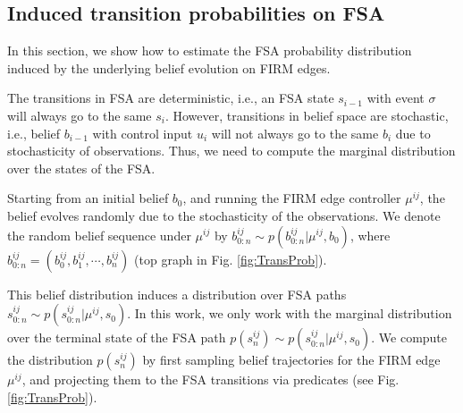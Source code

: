 \documentclass[conference]{IEEEtran}
\begin{document}






\subsection{Induced transition probabilities on FSA}
\label{sec:TransProb}
In this section, we show how to estimate the FSA probability distribution induced by the underlying belief evolution on FIRM edges. 

The transitions in FSA are deterministic, i.e., an FSA state $s_{i-1}$ with event $\sigma$ will always go to the same $s_{i}$. However, transitions in belief space are stochastic, i.e., belief $b_{i-1}$ with control input $u_{i}$ will not always go to the same $b_{i}$ due to stochasticity of observations.
Thus, we need to compute the marginal distribution over the states of the FSA.

Starting from an initial belief $b_{0}$, and running the FIRM edge controller $\mu^{ij}$, the belief evolves randomly due to the stochasticity of the observations. We denote the random belief sequence under $\mu^{ij}$ by $b_{0:n}^{ij}\sim p(b_{0:n}^{ij}|\mu^{ij},b_0)$, where $b_{0:n}^{ij}=(b_0^{ij},b_1^{ij},\cdots,b_n^{ij})$ (top graph in Fig. \ref{fig:TransProb}).

This belief distribution induces a distribution over FSA paths $s_{0:n}^{ij}\sim p(s_{0:n}^{ij}|\mu^{ij},s_0)$. 
In this work, we only work with the marginal distribution over the terminal state of the FSA path $p(s_{n}^{ij})\sim p(s_{0:n}^{ij}|\mu^{ij},s_0)$. We compute the distribution $p(s_{n}^{ij})$ by first sampling belief trajectories for the FIRM edge $\mu^{ij}$, and projecting them to the FSA transitions via predicates (see Fig. \ref{fig:TransProb}).
\end{document}

